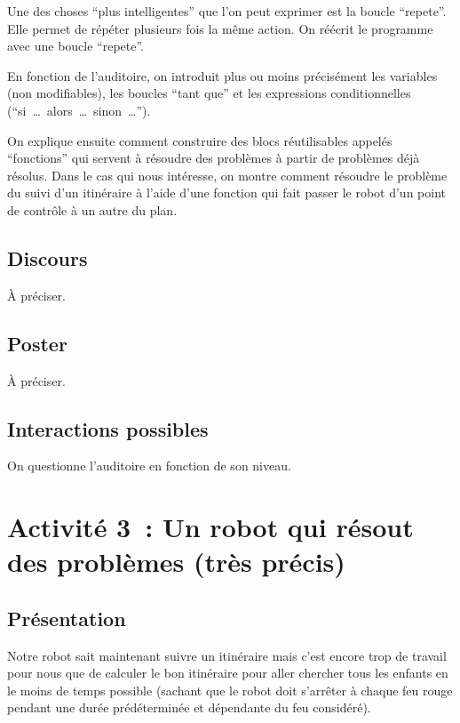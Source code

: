\documentclass[11pt,a4paper]{article}
\begin{document}
Une des choses ``plus intelligentes'' que l'on peut exprimer est
la boucle ``repete''. Elle permet de répéter plusieurs fois la même
action. On réécrit le programme avec une boucle ``repete''. 

En fonction de l'auditoire, on introduit plus ou moins précisément les
variables (non modifiables), les boucles ``tant que'' et les
expressions conditionnelles (``si~\ldots~alors~\ldots~sinon~\ldots'').

On explique ensuite comment construire des blocs réutilisables appelés
``fonctions'' qui servent à résoudre des problèmes à partir de problèmes
déjà résolus. Dans le cas qui nous intéresse, on montre comment 
résoudre le problème du suivi d'un itinéraire à l'aide d'une fonction
qui fait passer le robot d'un point de contrôle à un autre du plan. 

\subsection{Discours}

À préciser. 

\subsection{Poster}

À préciser. 

\subsection{Interactions possibles}

On questionne l'auditoire en fonction de son niveau. 

\newpage
\section{Activité 3~: Un robot qui résout des problèmes (très précis)}
\label{sec:act3}

\subsection{Présentation}

Notre robot sait maintenant suivre un itinéraire mais c'est encore
trop de travail pour nous que de calculer le bon itinéraire pour aller
chercher tous les enfants en le moins de temps possible (sachant que
le robot doit s'arrêter à chaque feu rouge pendant une durée
prédéterminée et dépendante du feu considéré). 
\end{document}
